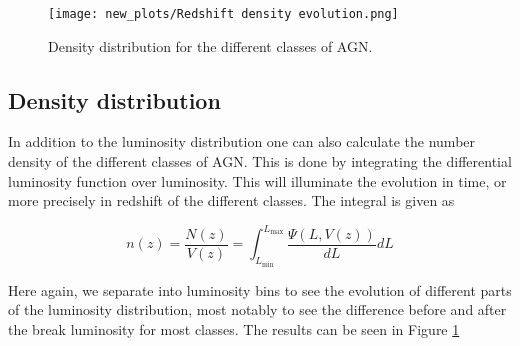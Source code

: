 \begin{figure}[H]
    \centering
    \texttt{[image: new\_plots/Redshift density evolution.png]}
    \caption{Density distribution for the different classes of AGN.}
    \label{fig:DD}
\end{figure}



\subsection{Density distribution}

In addition to the luminosity distribution one can also calculate the number density of the different classes of AGN. This is done by integrating the
differential luminosity function over luminosity. This will illuminate the evolution in time, or more precisely in redshift of the different classes. The integral is given as

\begin{equation}
    n(z) =\frac{N(z)}{V(z)} =  \int_{L_{\text{min}}}^{L_{\text{max}}} \frac{\Psi(L, V(z))}{dL} dL
\end{equation}

Here again, we separate into luminosity bins to see the evolution of different parts of the luminosity distribution, most notably to see the difference before and after the break luminosity for most classes. 
The results can be seen in Figure \ref*{fig:DD}








